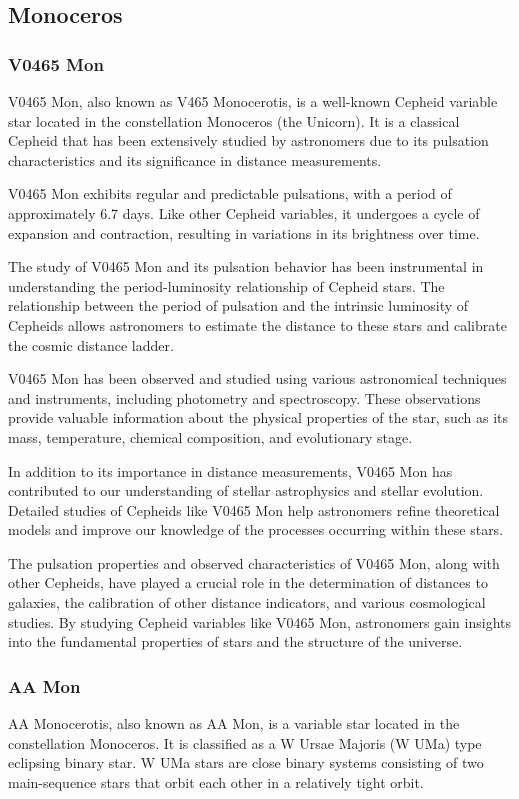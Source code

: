 \subsection{Monoceros}
\subsubsection*{ V0465 Mon }

V0465 Mon, also known as V465 Monocerotis, is a well-known Cepheid variable star located in the constellation Monoceros (the Unicorn). It is a classical Cepheid that has been extensively studied by astronomers due to its pulsation characteristics and its significance in distance measurements.

V0465 Mon exhibits regular and predictable pulsations, with a period of approximately 6.7 days. Like other Cepheid variables, it undergoes a cycle of expansion and contraction, resulting in variations in its brightness over time.

The study of V0465 Mon and its pulsation behavior has been instrumental in understanding the period-luminosity relationship of Cepheid stars. The relationship between the period of pulsation and the intrinsic luminosity of Cepheids allows astronomers to estimate the distance to these stars and calibrate the cosmic distance ladder.

V0465 Mon has been observed and studied using various astronomical techniques and instruments, including photometry and spectroscopy. These observations provide valuable information about the physical properties of the star, such as its mass, temperature, chemical composition, and evolutionary stage.

In addition to its importance in distance measurements, V0465 Mon has contributed to our understanding of stellar astrophysics and stellar evolution. Detailed studies of Cepheids like V0465 Mon help astronomers refine theoretical models and improve our knowledge of the processes occurring within these stars.

The pulsation properties and observed characteristics of V0465 Mon, along with other Cepheids, have played a crucial role in the determination of distances to galaxies, the calibration of other distance indicators, and various cosmological studies. By studying Cepheid variables like V0465 Mon, astronomers gain insights into the fundamental properties of stars and the structure of the universe.



\subsubsection*{ AA Mon }
AA Monocerotis, also known as AA Mon, is a variable star located in the constellation Monoceros. It is classified as a W Ursae Majoris (W UMa) type eclipsing binary star. W UMa stars are close binary systems consisting of two main-sequence stars that orbit each other in a relatively tight orbit.


